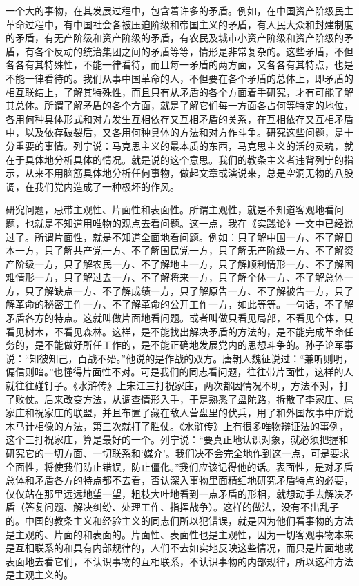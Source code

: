 一个大的事物，在其发展过程中，包含着许多的矛盾。例如，在中国资产阶级民主革命过程中，有中国社会各被压迫阶级和帝国主义的矛盾，有人民大众和封建制度的矛盾，有无产阶级和资产阶级的矛盾，有农民及城市小资产阶级和资产阶级的矛盾，有各个反动的统治集团之间的矛盾等等，情形是非常复杂的。这些矛盾，不但各各有其特殊性，不能一律看待，而且每一矛盾的两方面，又各各有其特点，也是不能一律看待的。我们从事中国革命的人，不但要在各个矛盾的总体上，即矛盾的相互联结上，了解其特殊性，而且只有从矛盾的各个方面着手研究，才有可能了解其总体。所谓了解矛盾的各个方面，就是了解它们每一方面各占何等特定的地位，各用何种具体形式和对方发生互相依存又互相矛盾的关系，在互相依存又互相矛盾中，以及依存破裂后，又各用何种具体的方法和对方作斗争。研究这些问题，是十分重要的事情。列宁说：马克思主义的最本质的东西，马克思主义的活的灵魂，就在于具体地分析具体的情况。就是说的这个意思。我们的教条主义者违背列宁的指示，从来不用脑筋具体地分析任何事物，做起文章或演说来，总是空洞无物的八股调，在我们党内造成了一种极坏的作风。

研究问题，忌带主观性、片面性和表面性。所谓主观性，就是不知道客观地看问题，也就是不知道用唯物的观点去看问题。这一点，我在《实践论》一文中已经说过了。所谓片面性，就是不知道全面地看问题。例如：只了解中国一方、不了解日本一方，只了解共产党一方、不了解国民党一方，只了解无产阶级一方、不了解资产阶级一方，只了解农民一方、不了解地主一方，只了解顺利情形一方、不了解困难情形一方，只了解过去一方、不了解将来一方，只了解个体一方、不了解总体一方，只了解缺点一方、不了解成绩一方，只了解原告一方、不了解被告一方，只了解革命的秘密工作一方、不了解革命的公开工作一方，如此等等。一句话，不了解矛盾各方的特点。这就叫做片面地看问题。或者叫做只看见局部，不看见全体，只看见树木，不看见森林。这样，是不能找出解决矛盾的方法的，是不能完成革命任务的，是不能做好所任工作的，是不能正确地发展党内的思想斗争的。孙子论军事说：“知彼知己，百战不殆。”他说的是作战的双方。唐朝人魏征说过：“兼听则明，偏信则暗。”也懂得片面性不对。可是我们的同志看问题，往往带片面性，这样的人就往往碰钉子。《水浒传》上宋江三打祝家庄，两次都因情况不明，方法不对，打了败仗。后来改变方法，从调查情形入手，于是熟悉了盘陀路，拆散了李家庄、扈家庄和祝家庄的联盟，并且布置了藏在敌人营盘里的伏兵，用了和外国故事中所说木马计相像的方法，第三次就打了胜仗。《水浒传》上有很多唯物辩证法的事例，这个三打祝家庄，算是最好的一个。列宁说：“要真正地认识对象，就必须把握和研究它的一切方面、一切联系和‘媒介’。我们决不会完全地作到这一点，可是要求全面性，将使我们防止错误，防止僵化。”我们应该记得他的话。表面性，是对矛盾总体和矛盾各方的特点都不去看，否认深入事物里面精细地研究矛盾特点的必要，仅仅站在那里远远地望一望，粗枝大叶地看到一点矛盾的形相，就想动手去解决矛盾（答复问题、解决纠纷、处理工作、指挥战争）。这样的做法，没有不出乱子的。中国的教条主义和经验主义的同志们所以犯错误，就是因为他们看事物的方法是主观的、片面的和表面的。片面性、表面性也是主观性，因为一切客观事物本来是互相联系的和具有内部规律的，人们不去如实地反映这些情况，而只是片面地或表面地去看它们，不认识事物的互相联系，不认识事物的内部规律，所以这种方法是主观主义的。

